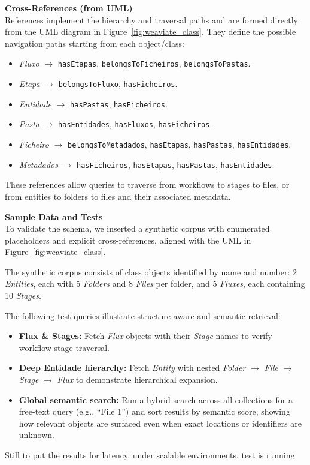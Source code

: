 \noindent\textbf{Cross-References (from UML)}\\
References implement the hierarchy and traversal paths and are formed directly from the UML diagram in Figure~\ref{fig:weaviate_class}. They define the possible navigation paths starting from each object/class:
\begin{itemize}
    \item \textit{Fluxo} \(\rightarrow\) \texttt{hasEtapas}, \texttt{belongsToFicheiros}, \texttt{belongsToPastas}.
    \item \textit{Etapa} \(\rightarrow\) \texttt{belongsToFluxo}, \texttt{hasFicheiros}.
    \item \textit{Entidade} \(\rightarrow\) \texttt{hasPastas}, \texttt{hasFicheiros}.
    \item \textit{Pasta} \(\rightarrow\) \texttt{hasEntidades}, \texttt{hasFluxos}, \texttt{hasFicheiros}.
    \item \textit{Ficheiro} \(\rightarrow\) \texttt{belongsToMetadados}, \texttt{hasEtapas}, \texttt{hasPastas}, \texttt{hasEntidades}.
    \item \textit{Metadados} \(\rightarrow\) \texttt{hasFicheiros}, \texttt{hasEtapas}, \texttt{hasPastas}, \texttt{hasEntidades}.
\end{itemize}
These references allow queries to traverse from workflows to stages to files, or from entities to folders to files and their associated metadata.

\noindent\textbf{Sample Data and Tests} \\
To validate the schema, we inserted a synthetic corpus with enumerated placeholders and explicit cross-references, aligned with the UML in Figure~\ref{fig:weaviate_class}.

The synthetic corpus consists of class objects identified by name and number: 2 \textit{Entities}, each with 5 \textit{Folders} and 8 \textit{Files} per folder, and 5 \textit{Fluxes}, each containing 10 \textit{Stages}.

The following test queries illustrate structure-aware and semantic retrieval:
\begin{itemize}
    \item \textbf{Flux \& Stages:} Fetch \textit{Flux} objects with their \textit{Stage} names to verify workflow-stage traversal.
    \item \textbf{Deep Entidade hierarchy:} Fetch \textit{Entity} with nested \textit{Folder} \(\rightarrow\) \textit{File} \(\rightarrow\) \textit{Stage} \(\rightarrow\) \textit{Flux} to demonstrate hierarchical expansion.
    \item \textbf{Global semantic search:} Run a hybrid search across all collections for a free-text query (e.g., “File 1”) and sort results by semantic score, showing how relevant objects are surfaced even when exact locations or identifiers are unknown.
\end{itemize}
Still to put the results for latency, under scalable environments, test is running


